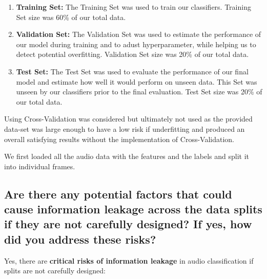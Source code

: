 \begin{enumerate}
	\item {\bf Training Set: } The Training Set was used to train our classifiers. Training Set size was 60\% of our total data.
	
	\item {\bf Validation Set: } The Validation Set was used to estimate the performance of our model during training and to adust hyperparameter, while helping us to detect potential overfitting. Validation Set size was 20\% of our total data.

	\item {\bf Test Set: } The Test Set was used to evaluate the performance of our final model and estimate how well it would perform on unseen data. This Set was unseen by our classifiers prior to the final evaluation. Test Set size was 20\% of our total data.


    
\end{enumerate}

Using Cross-Validation was considered but ultimately not used as the provided data-set was large enough to have a low risk if underfitting and produced an overall satisfying results without the implementation of Cross-Validation.


We first loaded all the audio data with the features and the labels and split it into individual frames. 



\subsection{Are there any potential factors that could cause information leakage across the data splits if they are not carefully designed? If yes, how did you address these risks?}

Yes, there are {\bf critical risks of information leakage} in audio classification if splits are not carefully designed:


\label{sec:Data Split:b}

